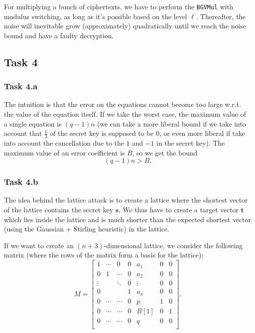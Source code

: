 \documentclass{article}
\begin{document}
For multiplying a bunch of ciphertexts, we have to perform the \texttt{BGVMul}
with modulus switching, as long as it's possible based on the level $\ell$.
Thereafter, the noise will inevitable grow (approximately) quadratically until
we reach the noise bound and have a faulty decryption.

\subsection*{Task 4}

\subsubsection*{Task 4.a}

The intuition is that the error on the equations cannot become too large w.r.t.
the value of the equation itself. If we take the worst case, the maximum value
of a single equation is $(q - 1)n$ (we can take a more liberal bound if we take
into account that $\frac{1}{3}$ of the secret key is supposed to be $0$, or
even more liberal if take into account the cancellation due to the $1$ and $-1$
in the secret key). The maximum value of an error coefficient is $B$, so we get
the bound \begin{equation}
  (q - 1)n > B.
\end{equation} 

\subsubsection*{Task 4.b}

The idea behind the lattice attack is to create a lattice where the shortest
vector of the lattice contains the secret key $\mathbf{s}$. We thus have to
create a target vector $\mathbf{t}$ which lies inside the lattice and is much
shorter than the expected shortest vector (using the Gaussian + Stirling
heuristic) in the lattice.

If we want to create an $(n+3)$-dimensional lattice, we consider the following
matrix (where the rows of the matrix form a basis for the lattice): 
\begin{equation}
  M = \begin{bmatrix} 
    1 & \cdots & 0 & 0 & a_1 & 0 & 0 \\
    0 & 1 & \cdots & 0 & a_2 & 0 & 0 \\
    \vdots & & \ddots & 0  & \vdots & 0 & 0 \\
    0 & & & 1 & a_{n} & 0 & 0 \\
    0 & \cdots & \cdots & 0 & p & 1 &  0 \\
    0 & \cdots & \cdots & 0 & B[1] & 0 & 1 \\
    0 & \cdots & \cdots & 0 & q & 0 & 0 \\
  \end{bmatrix}.
\end{equation} 
\end{document}
